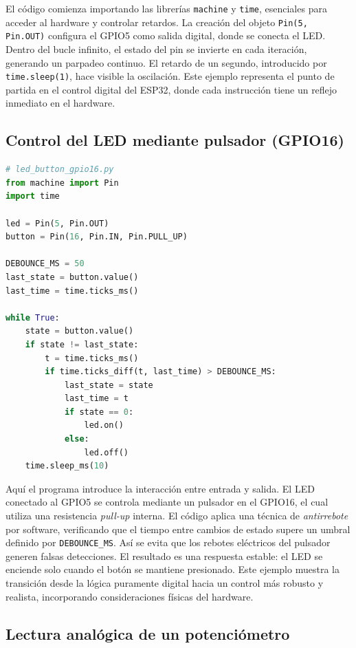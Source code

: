 \documentclass[a4paper,12pt]{article}
\begin{document}
El código comienza importando las librerías \texttt{machine} y \texttt{time}, esenciales para acceder al hardware y controlar retardos. La creación del objeto \texttt{Pin(5, Pin.OUT)} configura el GPIO5 como salida digital, donde se conecta el LED.  
Dentro del bucle infinito, el estado del pin se invierte en cada iteración, generando un parpadeo continuo. El retardo de un segundo, introducido por \texttt{time.sleep(1)}, hace visible la oscilación. Este ejemplo representa el punto de partida en el control digital del ESP32, donde cada instrucción tiene un reflejo inmediato en el hardware.

\subsection{Control del LED mediante pulsador (GPIO16)}

\begin{lstlisting}[language=Python, caption={Manejo del LED con un pulsador usando PULL\_UP interno}]
# led_button_gpio16.py
from machine import Pin
import time

led = Pin(5, Pin.OUT)
button = Pin(16, Pin.IN, Pin.PULL_UP)

DEBOUNCE_MS = 50
last_state = button.value()
last_time = time.ticks_ms()

while True:
    state = button.value()
    if state != last_state:
        t = time.ticks_ms()
        if time.ticks_diff(t, last_time) > DEBOUNCE_MS:
            last_state = state
            last_time = t
            if state == 0:
                led.on()
            else:
                led.off()
    time.sleep_ms(10)
\end{lstlisting}

Aquí el programa introduce la interacción entre entrada y salida. El LED conectado al GPIO5 se controla mediante un pulsador en el GPIO16, el cual utiliza una resistencia \textit{pull-up} interna.  
El código aplica una técnica de \textit{antirrebote} por software, verificando que el tiempo entre cambios de estado supere un umbral definido por \texttt{DEBOUNCE\_MS}. Así se evita que los rebotes eléctricos del pulsador generen falsas detecciones.  
El resultado es una respuesta estable: el LED se enciende solo cuando el botón se mantiene presionado. Este ejemplo muestra la transición desde la lógica puramente digital hacia un control más robusto y realista, incorporando consideraciones físicas del hardware.

\subsection{Lectura analógica de un potenciómetro}
\end{document}
